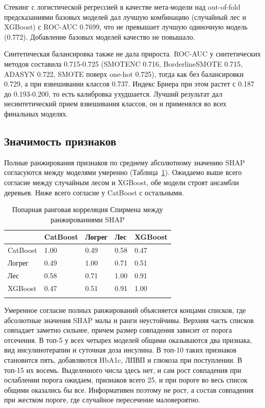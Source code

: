 \documentclass[pdflatex,sn-basic,Numbered]{sn-jnl}
\begin{document}
Стекинг с логистической регрессией в качестве мета-модели над out-of-fold предсказаниями базовых моделей дал лучшую комбинацию (случайный лес и XGBoost) с ROC-AUC 0.7699, что не превышает лучшую одиночную модель (0.772). Добавление базовых моделей качество не повышало.

Синтетическая балансировка также не дала прироста. ROC-AUC у синтетических методов составила 0.715-0.725 (SMOTENC 0.716, BorderlineSMOTE 0.715, ADASYN 0.722, SMOTE поверх one-hot 0.725), тогда как без балансировки 0.729, а при взвешивании классов 0.737. Индекс Бриера при этом растет с 0.187 до 0.193-0.200, то есть калибровка ухудшается. Лучший результат дал несинтетический прием взвешивания классов, он и применялся во всех финальных моделях.

\subsection{Значимость признаков}\label{subsec3_7}

Полные ранжирования признаков по среднему абсолютному значению SHAP согласуются между моделями умеренно (Таблица~\ref{tab6}). Ожидаемо выше всего согласие между случайным лесом и XGBoost, обе модели строят ансамбли деревьев. Ниже всего согласие у CatBoost с остальными.

\begin{table}[h]
\caption{Попарная ранговая корреляция Спирмена между ранжированиями SHAP}\label{tab6}%
\begin{tabular}{@{}lllll@{}}
\toprule
 & CatBoost & Логрег & Лес & XGBoost\\
\midrule
CatBoost & 1.00 & 0.49 & 0.58 & 0.47\\
Логрег & 0.49 & 1.00 & 0.71 & 0.51\\
Лес & 0.58 & 0.71 & 1.00 & 0.91\\
XGBoost & 0.47 & 0.51 & 0.91 & 1.00\\
\botrule
\end{tabular}
\end{table}

Умеренное согласие полных ранжирований объясняется концами списков, где абсолютные значения SHAP малы и ранги неустойчивы. Верхняя часть списков совпадает заметно сильнее, причем размер совпадения зависит от порога отсечения. В топ-5 у всех четырех моделей общими оказываются два признака, вид инсулинотерапии и суточная доза инсулина. В топ-10 таких признаков становится пять, добавляются HbA1c, ЛПВП и глюкоза при поступлении. В топ-15 их восемь. Выделенного числа здесь нет, и сам рост совпадения при ослаблении порога ожидаем, признаков всего 25, и при пороге во весь список общими оказались бы все. Информативен поэтому не рост, а состав совпадения при жестком пороге, где случайное пересечение маловероятно.
\end{document}
